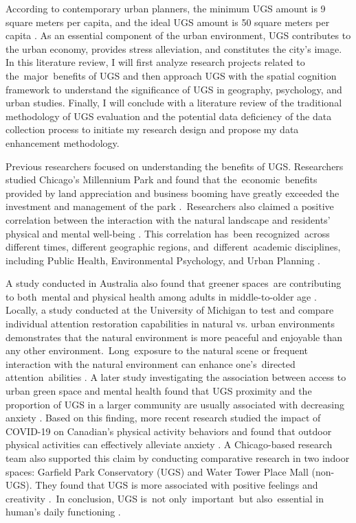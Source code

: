 According to contemporary urban planners, the minimum UGS amount is 9 square meters per capita, and the ideal UGS amount is 50 square meters per capita \parencite{russo_modern_2018}. As an essential component of the urban environment, UGS contributes to the urban economy, provides stress alleviation, and constitutes the city's image. In this literature review, I will first analyze research projects related to the major benefits of UGS and then approach UGS with the spatial cognition framework to understand the significance of UGS in geography, psychology, and urban studies. Finally, I will conclude with a literature review of the traditional methodology of UGS evaluation and the potential data deficiency of the data collection process to initiate my research design and propose my data enhancement methodology. 

Previous researchers focused on understanding the benefits of UGS. Researchers studied Chicago’s Millennium Park and found that the economic benefits provided by land appreciation and business booming have greatly exceeded the investment and management of the park \parencite{groos_millennium_2008}. Researchers also claimed a positive correlation between the interaction with the natural landscape and residents’ physical and mental well-being \parencite{bratman_impacts_2012}. This correlation has been recognized across different times, different geographic regions, and different academic disciplines, including Public Health, Environmental Psychology, and Urban Planning \parencite{wendelboe-nelson_scoping_2019}. 

A study conducted in Australia also found that greener spaces are contributing to both mental and physical health among adults in middle-to-older age \parencite{astell-burt_mental_2013}. Locally, a study conducted at the University of Michigan to test and compare individual attention restoration capabilities in natural vs. urban environments demonstrates that the natural environment is more peaceful and enjoyable than any other environment. Long exposure to the natural scene or frequent interaction with the natural environment can enhance one’s directed attention abilities \parencite{berman_cognitive_2008}. A later study investigating the association between access to urban green space and mental health found that UGS proximity and the proportion of UGS in a larger community are usually associated with decreasing anxiety \parencite{nutsford_ecological_2013}. Based on this finding, more recent research studied the impact of COVID-19 on Canadian’s physical activity behaviors and found that outdoor physical activities can effectively alleviate anxiety \parencite{lesser_impact_2020}. A Chicago-based research team also supported this claim by conducting comparative research in two indoor spaces: Garfield Park Conservatory (UGS) and Water Tower Place Mall (non-UGS). They found that UGS is more associated with positive feelings and creativity \parencite{schertz_neighborhood_2021}. In conclusion, UGS is not only important but also essential in human’s daily functioning \parencite{bertram_role_2015}.

